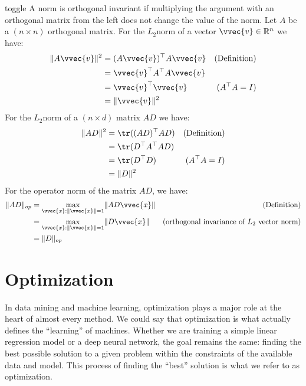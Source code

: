 \documentclass[letterpaper,10pt,english]{jupyterBook}
\begin{document}
\begin{enumerate}
\begin{sphinxuseclass}{toggle}
\sphinxAtStartPar
A norm is orthogonal invariant if multiplying the argument with an orthogonal matrix from the left does not change the value of the norm. Let \(A\) be a \((n\times n)\) orthogonal matrix. For the \(L_2\)\sphinxhyphen{}norm of a vector \(\vvec{v}\in\mathbb{R}^n\) we have:
\begin{align*}
    \lVert A\vvec{v} \rVert^2 &= (A\vvec{v})^\top A\vvec{v} & \text{(Definition)}\\ 
    &= \vvec{v}^\top A^\top A\vvec{v}\\ 
    &= \vvec{v}^\top \vvec{v} &(A^\top A =I)\\
    &= \lVert\vvec{v}\rVert^2
\end{align*}
\sphinxAtStartPar
For the \(L_2\)\sphinxhyphen{}norm of a \((n\times d)\) matrix \(AD\) we have:
\begin{align*}
    \lVert AD \rVert^2 &= \tr((AD)^\top AD) &\text{(Definition)}\\ 
    &= \tr(D^\top A^\top AD) &\\ 
    &= \tr(D^\top D) & (A^\top A=I)\\
    &= \lVert D\rVert^2 &
\end{align*}
\sphinxAtStartPar
For the operator norm of the matrix \(AD\), we have:
\begin{align*}
    \lVert AD \rVert_{op} &= \max_{\vvec{x}:\lVert\vvec{x}\rVert=1}\lVert AD\vvec{x}\rVert &\text{(Definition)}\\ 
    &= \max_{\vvec{x}:\lVert\vvec{x}\rVert=1}\lVert D\vvec{x}\rVert & \text{(orthogonal invariance of $L_2$ vector norm)}\\ 
    &= \lVert D\rVert_{op} &
\end{align*}
\end{sphinxuseclass}
\end{enumerate}

\sphinxstepscope


\chapter{Optimization}
\label{\detokenize{optimization:optimization}}\label{\detokenize{optimization::doc}}
\sphinxAtStartPar
In data mining and machine learning, optimization plays a major role at the heart of almost every method. We could say that optimization is what actually defines the “learning” of machines. Whether we are training a simple linear regression model or a deep neural network, the goal remains the same: finding the best possible solution to a given problem within the constraints of the available data and model. This process of finding the “best” solution is what we refer to as optimization.
\end{document}
